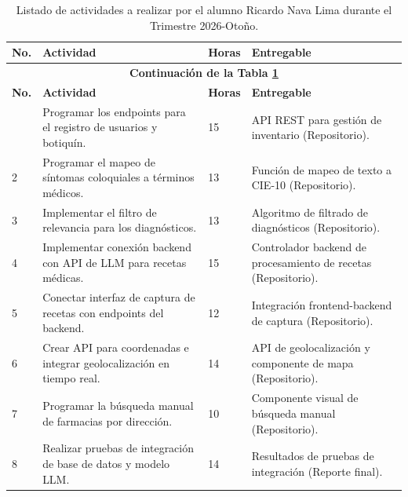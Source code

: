 {
\begin{longtable}{p{} p{} p{} p{}}
	\caption{Listado de actividades a realizar por el alumno Ricardo Nava Lima durante el Trimestre 2026-Otoño.}
  \label{table:calendarioActividades2}\\
  \toprule
\textbf{No.} &
\textbf{Actividad} &
\textbf {Horas} &
\textbf{Entregable} \\
\hline
\endfirsthead

\multicolumn{4}{c}{\textbf{Continuación de la Tabla \ref{table:calendarioActividades2}}}\\
\hline
\textbf{No.} &
\textbf{Actividad} &
\textbf{Horas} &
\textbf{Entregable} \\
\hline
\endhead
\hline
\endlastfoot
1 &
Programar los endpoints para el registro de usuarios y botiquín. &
15 &
API REST para gestión de inventario (Repositorio). \\
    \midrule

2 &
Programar el mapeo de síntomas coloquiales a términos médicos. &
13 &
Función de mapeo de texto a CIE-10 (Repositorio). \\
    \midrule

3 &
Implementar el filtro de relevancia para los diagnósticos. &
13 &
Algoritmo de filtrado de diagnósticos (Repositorio). \\
    \midrule
    
4 &
Implementar conexión backend con API de LLM para recetas médicas. &
15 &
Controlador backend de procesamiento de recetas (Repositorio). \\
    \midrule
    
5 &
Conectar interfaz de captura de recetas con endpoints del backend. &
12 &
Integración frontend-backend de captura (Repositorio). \\
    \midrule

6 &
Crear API para coordenadas e integrar geolocalización en tiempo real. &
14 &
API de geolocalización y componente de mapa (Repositorio). \\
    \midrule

7 &
Programar la búsqueda manual de farmacias por dirección. &
10 &
Componente visual de búsqueda manual (Repositorio). \\
    \midrule

8 &
Realizar pruebas de integración de base de datos y modelo LLM. &
14 &
Resultados de pruebas de integración (Reporte final). \\
    \midrule


\end{longtable}}

